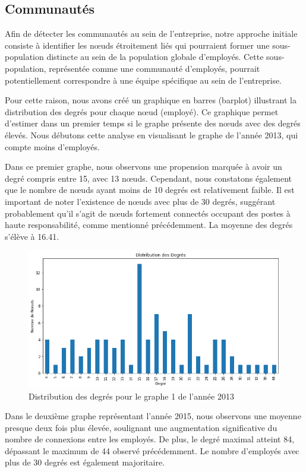 \documentclass{article}
\begin{document}
\subsection{Communautés}
Afin de détecter les communautés au sein de l'entreprise, notre approche initiale consiste à identifier les nœuds étroitement liés qui pourraient former une sous-population distincte au sein de la population globale d'employés. Cette sous-population, représentée comme une communauté d'employés, pourrait potentiellement correspondre à une équipe spécifique au sein de l'entreprise.

Pour cette raison, nous avons créé un graphique en barres (barplot) illustrant la distribution des degrés pour chaque nœud (employé). Ce graphique permet d'estimer dans un premier temps si le graphe présente des nœuds avec des degrés élevés. Nous débutons cette analyse en visualisant le graphe de l'année 2013, qui compte moins d'employés.

Dans ce premier graphe, nous observons une propension marquée à avoir un degré compris entre 15, avec 13 nœuds. Cependant, nous constatons également que le nombre de nœuds ayant moins de 10 degrés est relativement faible. Il est important de noter l'existence de nœuds avec plus de 30 degrés, suggérant probablement qu'il s'agit de nœuds fortement connectés occupant des postes à haute responsabilité, comme mentionné précédemment. La moyenne des degrés s'élève à 16.41.
\begin{figure}[h]
    \centering
    \includegraphics[width=16.4cm]{assets/communaute/distribution_deg_2013}
    \caption{Distribution des degrés pour le graphe 1 de l'année 2013}
    \label{fig:distribution_deg_2013}
\end{figure}

Dans le deuxième graphe représentant l'année 2015, nous observons une moyenne presque deux fois plus élevée, soulignant une augmentation significative du nombre de connexions entre les employés. De plus, le degré maximal atteint 84, dépassant le maximum de 44 observé précédemment. Le nombre d'employés avec plus de 30 degrés est également majoritaire.
\end{document}
